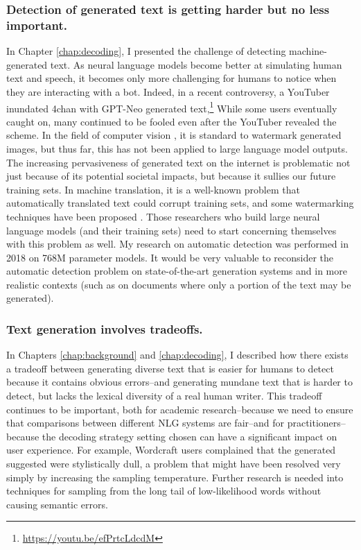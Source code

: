 \subsubsection{Detection of generated text is getting harder but no less important.}
	In Chapter \ref{chap:decoding}, I presented the challenge of detecting machine-generated text.
	As neural language models become better at simulating human text and speech, it becomes only more challenging for humans to notice when they are interacting with a bot.
	Indeed, in a recent controversy, a YouTuber inundated 4chan with GPT-Neo generated text,\footnote{\url{https://youtu.be/efPrtcLdcdM}}
	While some users eventually caught on, many continued to be fooled even after the YouTuber revealed the scheme.
	In the field of computer vision \citep{saharia2022photorealistic,ramesh2022hierarchical}, it is standard to watermark generated images, but thus far, this has not been applied to large language model outputs.
	The increasing pervasiveness of generated text on the internet is problematic not just because of its potential societal impacts, but because it sullies our future training sets.
	In machine translation, it is a well-known problem that automatically translated text could corrupt training sets, and some watermarking techniques have been proposed \citep{venugopal2011watermarking}.
	Those researchers who build large neural language models (and their training sets) need to start concerning themselves with this problem as well.
	My research on automatic detection was performed in 2018 on 768M parameter models.
	It would be very valuable to reconsider the automatic detection problem on state-of-the-art generation systems and in more realistic contexts (such as on documents where only a portion of the text may be generated).

\subsubsection{Text generation involves tradeoffs.}
	In Chapters \ref{chap:background} and \ref{chap:decoding}, I described how there exists a tradeoff between generating diverse text that is easier for humans to detect because it contains obvious errors--and generating mundane text that is harder to detect, but lacks the lexical diversity of a real human writer.
	This tradeoff continues to be important, both for academic research--because we need to ensure that  comparisons between different NLG systems are fair--and for practitioners--because the decoding strategy setting chosen can have a significant impact on user experience.
	For example, Wordcraft users complained that the generated suggested were stylistically dull, a problem that might have been resolved very simply by increasing the sampling temperature.
	Further research is needed into techniques for sampling from the long tail of low-likelihood words without causing semantic errors.

